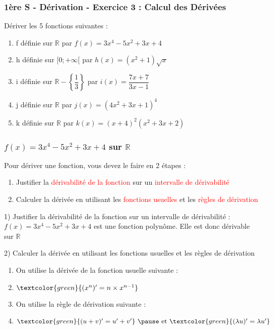 \documentclass[t]{beamer}
\begin{document}
	\begin{frame}
		\frametitle{1ère S - Dérivation - Exercice 3 : Calcul des Dérivées}
		Dériver les 5 fonctions suivantes :
		\begin{enumerate}
			\item f définie sur $\mathbb{R}$ par $f(x) = 3x^4 - 5x^2 + 3x + 4 $
			\item h définie sur $[0;+\infty[$ par $h(x) = (x^2+1)\sqrt{x} $
			\item i définie sur $\mathbb{R} - \left\lbrace  \dfrac{1}{3} \right\rbrace $ par $i(x) = \dfrac{7x+7}{3x-1} $
			\item j définie sur $\mathbb{R}$ par $j(x) = (4x^2+3x+1)^4$
			\item k définie sur $\mathbb{R}$ par $k(x) = (x+4)^2 (x^2+3x+2) $
		\end{enumerate}
	\end{frame}

	\begin{frame}
		\frametitle{$f(x) = 3x^4 - 5x^2 + 3x + 4 $ sur $\mathbb{R}$}
		\pause
		Pour dériver une fonction, vous devez le faire en 2 étapes : 
		\pause
		\begin{enumerate}
			\item Justifier la \textcolor{red}{dérivabilité de la fonction} \pause sur un \textcolor{red}{intervalle de dérivabilité}
			\pause
			\item Calculer la dérivée en utilisant les \textcolor{red}{fonctions usuelles} \pause et les \textcolor{red}{règles de dérivation}
			\pause
		\end{enumerate}

		\begin{block}{1) Justifier la dérivabilité de la fonction sur un intervalle de dérivabilité :}
			\pause
			$f(x) = 3x^4 - 5x^2 + 3x + 4$ est une fonction polynôme. \pause Elle est donc dérivable sur $\mathbb{R}$
			\pause
		\end{block}

			\begin{block}{2) Calculer la dérivée en utilisant les fonctions usuelles et les règles de dérivation}
			\pause
			\begin{enumerate}[]
				\item On utilise la dérivée de la fonction usuelle suivante :
				\pause
				\item \(\textcolor{green}{ (x^n)' = n \times x^{n-1} }\)
				\pause
				\item On utilise la règle de dérivation suivante :
				\pause
				\item \(\textcolor{green}{(u+v)' = u' + v'}$ \pause et $\textcolor{green}{ (\lambda u)' = \lambda u'}\)
				\pause
			\end{enumerate}
		\end{block}
	\end{frame}
\end{document}
